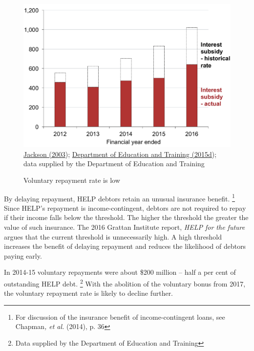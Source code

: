 \documentclass[embargoed]{grattan}
\begin{document}
\begin{figure}
\caption{Voluntary repayment rate is low}\label{fig:fig8-voluntary-repayment-rate-is-low}

\includegraphics[page=8]{atlas/Chartpack.pdf}
{\protect\hyperlink{_ENREF_50}{Jackson (2003}); \protect\hyperlink{_ENREF_27}{Department of Education and Training (2015d}); data supplied by the Department of Education and Training}
\end{figure}

By delaying repayment, HELP debtors retain an unusual insurance benefit.%
\footnote{For discussion of the insurance benefit of income-contingent loans, see Chapman\emph{, et al.} (2014), p. 36} Since HELP's repayment is income-contingent, debtors are not required to repay if their income falls below the threshold.
The higher the threshold the greater the value of such insurance.
The 2016 Grattan Institute report, \emph{HELP for the future} argues that the current threshold is unnecessarily high.
A high threshold increases the benefit of delaying repayment and reduces the likelihood of debtors paying early.

In 2014-15 voluntary repayments were about \$200 million -- half a per cent of outstanding HELP debt.%
\footnote{Data supplied by the Department of Education and Training} With the abolition of the voluntary bonus from 2017, the voluntary repayment rate is likely to decline further.
\end{document}
